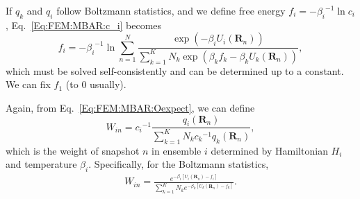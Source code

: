 If $q_k$ and $q_i$ follow Boltzmann statistics, and we define free energy $f_i=-{\beta_i}^{-1}\ln{c_i}$, Eq.~\ref{Eq:FEM:MBAR:c_i} becomes
\begin{equation}
f_i=-{\beta_i}^{-1}\ln{\sum\limits_{n=1}^N \frac{\exp{\left(-\beta_i U_i(\mathbf{R}_n)\right)}}{\sum_{k=1}^{K}N_k\exp{\left(\beta_kf_k-\beta_kU_k(\mathbf{R}_n)\right)}}},
\label{Eq:FEM:MBAR:f_i_final}
\end{equation}
which must be solved self-consistently and can be determined up to a constant. We can fix $f_1$ (to 0 usually). 

Again, from Eq.~\ref{Eq:FEM:MBAR:Oexpect}, we can define
\begin{equation}
W_{in}={c_i}^{-1}\frac{q_i(\mathbf{R}_n)}{\sum_{k=1}^{K}N_k{c_k}^{-1}q_k(\mathbf{R}_n)},
\end{equation}
which is the weight of snapshot $n$ in ensemble $i$ determined by Hamiltonian $H_i$ and temperature $\beta_i$. Specifically, for the Boltzmann statistics,
\begin{align}
W_{in}=\frac{e^{-\beta_i \left[U_i(\mathbf{R}_n)-f_i\right]}}{\sum_{k=1}^{K}N_k e^{-\beta_k \left[U_k(\mathbf{R}_n)-f_k\right]}}.
\end{align}

